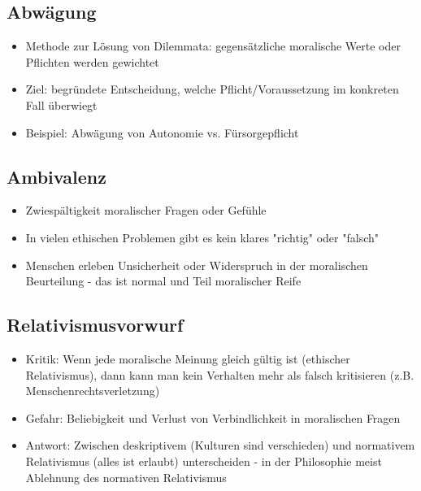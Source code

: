 \subsection{Abwägung}
\begin{itemize}
    \item Methode zur Lösung von Dilemmata: gegensätzliche moralische Werte oder Pflichten werden gewichtet
    \item Ziel: begründete Entscheidung, welche Pflicht/Voraussetzung im konkreten Fall überwiegt
    \item Beispiel: Abwägung von Autonomie vs. Fürsorgepflicht
\end{itemize}

\subsection{Ambivalenz}
\begin{itemize}
    \item Zwiespältigkeit moralischer Fragen oder Gefühle
    \item In vielen ethischen Problemen gibt es kein klares "richtig" oder "falsch"
    \item Menschen erleben Unsicherheit oder Widerspruch in der moralischen Beurteilung - das ist normal und Teil moralischer Reife
\end{itemize}

\subsection{Relativismusvorwurf}
\begin{itemize}
    \item Kritik: Wenn jede moralische Meinung gleich gültig ist (ethischer Relativismus), dann kann man kein Verhalten mehr als falsch kritisieren (z.B. Menschenrechtsverletzung)
    \item Gefahr: Beliebigkeit und Verlust von Verbindlichkeit in moralischen Fragen
    \item Antwort: Zwischen deskriptivem (Kulturen sind verschieden) und normativem Relativismus (alles ist erlaubt) unterscheiden - in der Philosophie meist Ablehnung des normativen Relativismus
\end{itemize}
